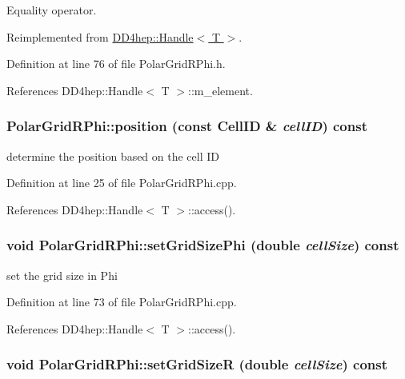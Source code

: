 Equality operator. 

Reimplemented from \hyperlink{class_d_d4hep_1_1_handle_a618470283b3a2cc5ed0545fec90dc759}{DD4hep::Handle$<$ T $>$}.

Definition at line 76 of file PolarGridRPhi.h.

References DD4hep::Handle$<$ T $>$::m\_\-element.\hypertarget{class_d_d4hep_1_1_geometry_1_1_polar_grid_r_phi_a8da3253613f37b1c9c93a2cd88767b0c}{
\subsubsection[{position}]{ PolarGridRPhi::position (const CellID \& {\em cellID}) const}}
\label{class_d_d4hep_1_1_geometry_1_1_polar_grid_r_phi_a8da3253613f37b1c9c93a2cd88767b0c}


determine the position based on the cell ID 

Definition at line 25 of file PolarGridRPhi.cpp.

References DD4hep::Handle$<$ T $>$::access().\hypertarget{class_d_d4hep_1_1_geometry_1_1_polar_grid_r_phi_af6528b084c7fb0eeccc69eea5f9cc510}{
\subsubsection[{setGridSizePhi}]{\setlength{\rightskip}{0pt plus 5cm}void PolarGridRPhi::setGridSizePhi (double {\em cellSize}) const}}
\label{class_d_d4hep_1_1_geometry_1_1_polar_grid_r_phi_af6528b084c7fb0eeccc69eea5f9cc510}


set the grid size in Phi 

Definition at line 73 of file PolarGridRPhi.cpp.

References DD4hep::Handle$<$ T $>$::access().\hypertarget{class_d_d4hep_1_1_geometry_1_1_polar_grid_r_phi_ae5229388a420afe11aab34f26118de28}{
\subsubsection[{setGridSizeR}]{\setlength{\rightskip}{0pt plus 5cm}void PolarGridRPhi::setGridSizeR (double {\em cellSize}) const}}
\label{class_d_d4hep_1_1_geometry_1_1_polar_grid_r_phi_ae5229388a420afe11aab34f26118de28}


